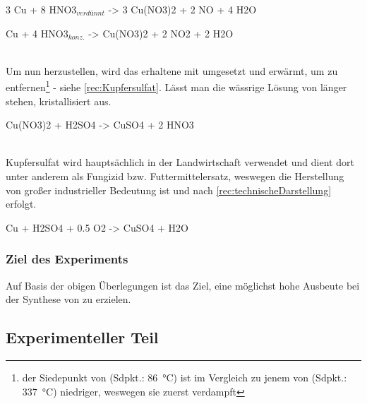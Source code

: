 \documentclass{article}
\begin{document}
        \begin{reaction}
          3 Cu\sld{} + 8 HNO3\aq$_{verdünnt}$ -> 3 Cu(NO3)2\aq{} + 2 NO\gas{} + 4 H2O \label{rec:LosenKupfereins}
        \end{reaction} 
          
        \begin{reaction}
          Cu\sld{} + 4 HNO3\aq$_{konz.}$ -> Cu(NO3)2\aq{} + 2 NO2\gas{} + 2 H2O \label{rec:LosenKupferzwei}
        \end{reaction} \\
        
        Um nun  herzustellen, wird das erhaltene  mit  umgesetzt und erwärmt, um  zu entfernen\footnote{der Siedepunkt von  (Sdpkt.: \SI[mode=text]{86}{\degreeCelsius}) ist im Vergleich zu jenem von  (Sdpkt.: \SI[mode=text]{337}{\degreeCelsius}) niedriger, weswegen sie zuerst verdampft} - siehe \ref{rec:Kupfersulfat}. Lässt man die wässrige Lösung von  länger stehen, kristallisiert  aus.
        
        \begin{reaction}
          Cu(NO3)2\aq{} + H2SO4\aq{} -> CuSO4\aq{} + 2 HNO3\aq \label{rec:Kupfersulfat}
        \end{reaction} \\
         
        Kupfersulfat wird hauptsächlich in der Landwirtschaft verwendet und dient dort unter anderem als Fungizid bzw. Futtermittelersatz, weswegen die Herstellung von großer industrieller Bedeutung ist und nach \ref{rec:technischeDarstellung} erfolgt.
        
        \begin{reaction}
          Cu\sld{} + H2SO4\aq{} + 0.5 O2\gas{} -> CuSO4\aq{} + H2O \label{rec:technischeDarstellung}
        \end{reaction}
        
   
      \subsubsection{Ziel des Experiments}
    
        Auf Basis der obigen Überlegungen ist das Ziel, eine möglichst hohe Ausbeute bei der Synthese von  zu erzielen.
    
    \subsection{Experimenteller Teil}
  
\end{document}
